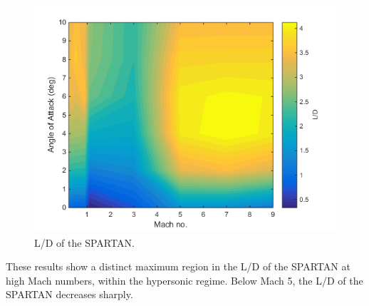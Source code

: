 \begin{figure}
\centering
\includegraphics[width=0.7\linewidth]{figures/3_vehicle_design/LD}
\caption{L/D of the SPARTAN.}
\label{fig:LD}
\end{figure}

These results show a distinct maximum region in the L/D of the SPARTAN at high Mach numbers, within the hypersonic regime. Below Mach 5, the L/D of the SPARTAN decreases sharply. 

